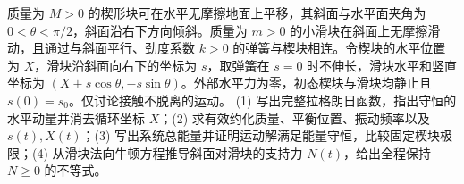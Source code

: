 质量为 \(M>0\) 的楔形块可在水平无摩擦地面上平移，其斜面与水平面夹角为 \(0<\theta<\pi/2\)，斜面沿右下方向倾斜。质量为 \(m>0\) 的小滑块在斜面上无摩擦滑动，且通过与斜面平行、劲度系数 \(k>0\) 的弹簧与楔块相连。令楔块的水平位置为 \(X\)，滑块沿斜面向右下的坐标为 \(s\)，取弹簧在 \(s=0\) 时不伸长，滑块水平和竖直坐标为 \((X+s\cos\theta,-s\sin\theta)\)。外部水平力为零，初态楔块与滑块均静止且 \(s(0)=s_0\)。仅讨论接触不脱离的运动。
(1) 写出完整拉格朗日函数，指出守恒的水平动量并消去循环坐标 \(X\)；(2) 求有效约化质量、平衡位置、振动频率以及 \(s(t),X(t)\)；(3) 写出系统总能量并证明运动解满足能量守恒，比较固定楔块极限；(4) 从滑块法向牛顿方程推导斜面对滑块的支持力 \(N(t)\)，给出全程保持 \(N\ge0\) 的不等式。
